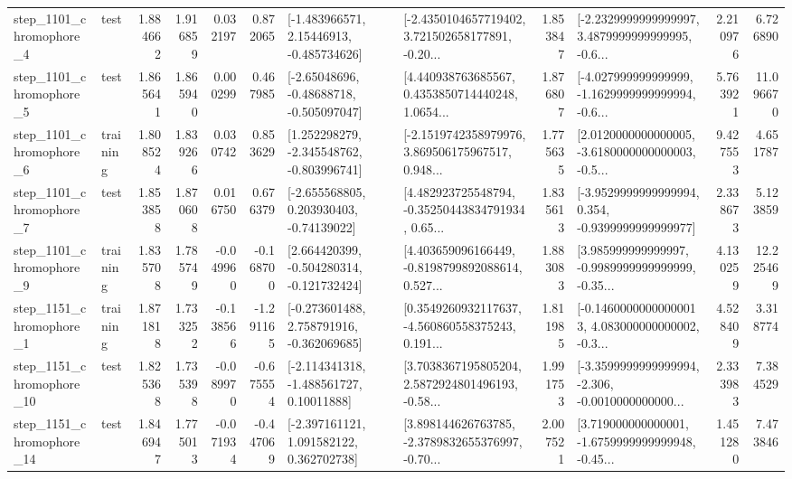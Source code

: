 \begin{tabular}{llrrrrllrlrr}
  step\_1101\_chromophore\_4 &      test &      1.884662 &    1.916859 &      0.032197 &  0.872065 &    [-1.483966571, 2.15446913, -0.485734626] &  [-2.4350104657719402, 3.721502658177891, -0.20... &       1.853847 &  [-2.2329999999999997, 3.4879999999999995, -0.6... &            2.210976 &          6.726890 \\
  step\_1101\_chromophore\_5 &      test &      1.865641 &    1.865940 &      0.000299 &  0.467985 &    [-2.65048696, -0.48688718, -0.505097047] &  [4.440938763685567, 0.4353850714440248, 1.0654... &       1.876807 &  [-4.027999999999999, -1.1629999999999994, -0.6... &            5.763921 &         11.096670 \\
  step\_1101\_chromophore\_6 &  training &      1.808524 &    1.839266 &      0.030742 &  0.853629 &   [1.252298279, -2.345548762, -0.803996741] &  [-2.1519742358979976, 3.869506175967517, 0.948... &       1.775635 &  [2.0120000000000005, -3.6180000000000003, -0.5... &            9.427553 &          4.651787 \\
  step\_1101\_chromophore\_7 &      test &      1.853858 &    1.870608 &      0.016750 &  0.676379 &    [-2.655568805, 0.203930403, -0.74139022] &  [4.482923725548794, -0.35250443834791934, 0.65... &       1.835613 &  [-3.9529999999999994, 0.354, -0.9399999999999977] &            2.338673 &          5.123859 \\
  step\_1101\_chromophore\_9 &  training &      1.835708 &    1.785749 &     -0.049960 & -0.168700 &   [2.664420399, -0.504280314, -0.121732424] &  [4.403659096166449, -0.8198799892088614, 0.527... &       1.883083 &  [3.985999999999997, -0.9989999999999999, -0.35... &            4.130259 &         12.225469 \\
  step\_1151\_chromophore\_1 &  training &      1.871818 &    1.733252 &     -0.138566 & -1.291165 &   [-0.273601488, 2.758791916, -0.362069685] &  [0.3549260932117637, -4.560860558375243, 0.191... &       1.811985 &  [-0.14600000000000013, 4.083000000000002, -0.3... &            4.528409 &          3.318774 \\
 step\_1151\_chromophore\_10 &      test &      1.825368 &    1.735398 &     -0.089970 & -0.675554 &    [-2.114341318, -1.488561727, 0.10011888] &  [3.7038367195805204, 2.5872924801496193, -0.58... &       1.991753 &  [-3.3599999999999994, -2.306, -0.0010000000000... &            2.333983 &          7.384529 \\
 step\_1151\_chromophore\_14 &      test &      1.846947 &    1.775013 &     -0.071934 & -0.447069 &    [-2.397161121, 1.091582122, 0.362702738] &  [3.898144626763785, -2.3789832655376997, -0.70... &       2.007521 &  [3.719000000000001, -1.6759999999999948, -0.45... &            1.451280 &          7.473846 \\

\end{tabular}
